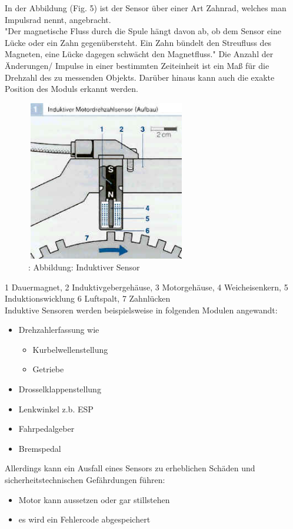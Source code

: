 	
	\begin{flushleft}
		In der Abbildung (Fig. 5) ist der Sensor über einer Art Zahnrad, welches man Impulsrad nennt, angebracht.\\
		"Der magnetische Fluss durch die Spule hängt davon ab, ob dem Sensor eine Lücke oder ein Zahn gegenübersteht. Ein Zahn bündelt den Streufluss des Magneten, eine Lücke dagegen schwächt den Magnetfluss." \cite{TS_ind_funkt}  
		Die Anzahl der Änderungen/ Impulse in einer bestimmten Zeiteinheit ist ein Maß für die Drehzahl des zu messenden Objekts. Darüber hinaus kann auch die exakte Position des Moduls erkannt werden.\\						
	\end{flushleft}
	
	\begin{figure}
		\centering
		\includegraphics[width=7cm, height=7cm] {aufbau_induktiv.png}
		\caption{\cite{TS_ind_funkt_pic}: Abbildung: Induktiver Sensor}
	\end{figure}
	
	\begin{flushleft}
		1 Dauermagnet, 2 Induktivgebergehäuse, 3 Motorgehäuse, 4 Weicheisenkern, 5 Induktionswicklung 6 Luftspalt, 7 Zahnlücken\\
		Induktive Sensoren werden beispielsweise in folgenden Modulen angewandt:
		
		\begin{itemize}
			\item Drehzahlerfassung wie
			\begin{itemize}
				\item Kurbelwellenstellung
				\item Getriebe
			\end{itemize}	
			\item Drosselklappenstellung
			\item Lenkwinkel z.b. ESP
			\item Fahrpedalgeber
			\item Bremspedal
		\end{itemize}
		
		Allerdings kann ein Ausfall eines Sensors zu erheblichen Schäden und sicherheitstechnischen Gefährdungen führen:
		\begin{itemize}
			\item Motor kann aussetzen oder gar stillstehen
			\item es wird ein Fehlercode abgespeichert
		\end{itemize}	
	\end{flushleft}				
	
